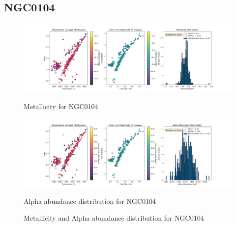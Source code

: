 \documentclass[a4paper,12pt]{article}
\begin{document}
\subsection{NGC0104}
\begin{figure}[H]
    \centering
    \begin{minipage}[b]{0.8\textwidth}
        \centering
        \includegraphics[width=\textwidth]{NGC0104_metalicity.png}
        \caption{Metallicity for NGC0104}
        \label{fig:NGC0104_metalicity}
    \end{minipage}
    \hfill
    \begin{minipage}[b]{0.8\textwidth}
        \centering
        \includegraphics[width=\textwidth]{NGC0104_alpha.png}
        \caption{Alpha abundance distribution for NGC0104}
        \label{fig:NGC0104_alpha}
    \end{minipage}
    \caption{Metallicity and Alpha abundance distribution for NGC0104}
    \label{fig:NGC0104_combined}
\end{figure}
\clearpage
\end{document}
